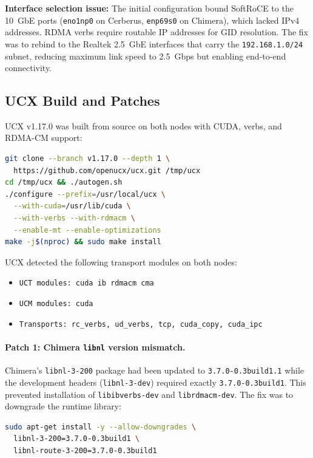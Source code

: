 \documentclass[11pt,letterpaper]{article}
\theoremstyle{definition}
\begin{document}
\textbf{Interface selection issue:} The initial configuration bound SoftRoCE to the 10~GbE ports (\texttt{eno1np0} on Cerberus, \texttt{enp69s0} on Chimera), which lacked IPv4 addresses. RDMA verbs require routable IP addresses for GID resolution. The fix was to rebind to the Realtek 2.5~GbE interfaces that carry the \texttt{192.168.1.0/24} subnet, reducing maximum link speed to 2.5~Gbps but enabling end-to-end connectivity.

\subsection{UCX Build and Patches}
\label{sec:test1-ucx-build}

UCX v1.17.0 was built from source on both nodes with CUDA, verbs, and RDMA-CM support:

\begin{lstlisting}[language=bash,caption={UCX v1.17.0 build configuration}]
git clone --branch v1.17.0 --depth 1 \
  https://github.com/openucx/ucx.git /tmp/ucx
cd /tmp/ucx && ./autogen.sh
./configure --prefix=/usr/local/ucx \
  --with-cuda=/usr/lib/cuda \
  --with-verbs --with-rdmacm \
  --enable-mt --enable-optimizations
make -j$(nproc) && sudo make install
\end{lstlisting}

UCX detected the following transport modules on both nodes:
\begin{itemize}
    \item \texttt{UCT modules: cuda ib rdmacm cma}
    \item \texttt{UCM modules: cuda}
    \item \texttt{Transports: rc\_verbs, ud\_verbs, tcp, cuda\_copy, cuda\_ipc}
\end{itemize}

\paragraph{Patch 1: Chimera \texttt{libnl} version mismatch.}
Chimera's \texttt{libnl-3-200} package had been updated to \texttt{3.7.0-0.3build1.1} while the development headers (\texttt{libnl-3-dev}) required exactly \texttt{3.7.0-0.3build1}. This prevented installation of \texttt{libibverbs-dev} and \texttt{librdmacm-dev}. The fix was to downgrade the runtime library:
\begin{lstlisting}[language=bash,caption={libnl version fix on Chimera}]
sudo apt-get install -y --allow-downgrades \
  libnl-3-200=3.7.0-0.3build1 \
  libnl-route-3-200=3.7.0-0.3build1
\end{lstlisting}
\end{document}
